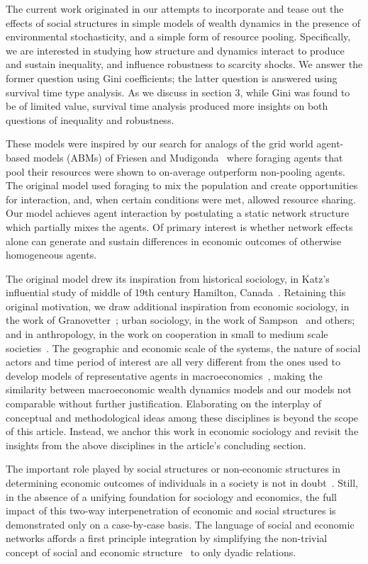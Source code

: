\documentclass[sigconf]{acmart}
\begin{document}
The current work originated in our attempts to incorporate and tease out the effects of social structures in simple models of wealth dynamics in the presence of environmental stochasticity, and a simple form of resource pooling. Specifically, we are interested in studying how structure and dynamics interact to produce and sustain inequality, and influence robustness to scarcity shocks. We answer the former question using Gini coefficients; the latter question is answered using survival time type analysis. As we discuss in section 3, while Gini was found to be of limited value, survival time analysis produced more insights on both questions of inequality and robustness. 

These models were inspired by our search for analogs of the grid world agent-based models (ABMs) of Friesen and Mudigonda~\cite{srimil} where foraging agents that pool their resources were shown to on-average outperform non-pooling agents. The original model used foraging to mix the population and create opportunities for interaction, and, when certain conditions were met, allowed resource sharing. Our model achieves agent interaction by postulating a static network structure which partially mixes the agents. Of primary interest is whether network effects alone can generate and sustain differences in economic outcomes of otherwise homogeneous agents.  

The original model drew its inspiration from historical sociology, in Katz's influential study of middle of 19th century Hamilton, Canada~\cite{katz2013people}. Retaining this original motivation, we draw additional inspiration from economic sociology, in the work of Granovetter~\cite{granovetter2005}; urban sociology, in the work of Sampson~\cite{sampson2002} and others; and in anthropology, in the work on cooperation in small to medium scale societies~\cite{avner1994,white2011kinship}. The geographic and economic scale of the systems, the nature of social actors and time period of interest are all very different from the ones used to develop models of representative agents in macroeconomics~\cite{benhabib2018}, making the similarity between macroeconomic wealth dynamics models and our models not comparable without further justification. Elaborating on the interplay of conceptual and methodological ideas among these disciplines is beyond the scope of this article. Instead, we anchor this work in economic sociology and revisit the insights from the above disciplines in the article's concluding section.

The important role played by social structures or non-economic structures in determining economic outcomes of individuals in a society is not in doubt~\cite{granovetter2005,jackson_rev2017}. Still, in the absence of a unifying foundation for sociology and economics, the full impact of this two-way interpenetration of economic and social structures is demonstrated only on a case-by-case basis. The language of social and economic networks affords a first principle integration by simplifying the non-trivial concept of social and economic structure~\cite{martin_lee} to only dyadic relations. 
\end{document}
